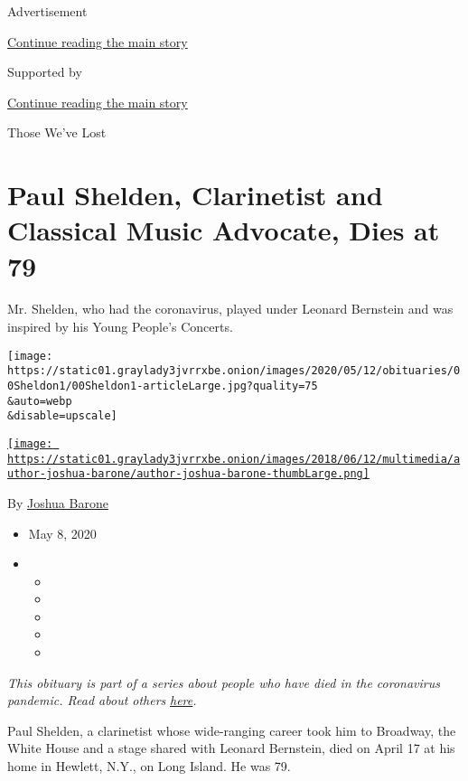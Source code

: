 Advertisement

\protect\hyperlink{after-top}{Continue reading the main story}

Supported by

\protect\hyperlink{after-sponsor}{Continue reading the main story}

Those We've Lost

\hypertarget{paul-shelden-clarinetist-and-classical-music-advocate-dies-at-79}{%
\section{Paul Shelden, Clarinetist and Classical Music Advocate, Dies at
79}\label{paul-shelden-clarinetist-and-classical-music-advocate-dies-at-79}}

Mr. Shelden, who had the coronavirus, played under Leonard Bernstein and
was inspired by his Young People's Concerts.

\texttt{[image: https://static01.graylady3jvrrxbe.onion/images/2020/05/12/obituaries/00Sheldon1/00Sheldon1-articleLarge.jpg?quality=75\\\&auto=webp\\\&disable=upscale]}

\href{https://www.nytimes3xbfgragh.onion/by/joshua-barone}{\texttt{[image: https://static01.graylady3jvrrxbe.onion/images/2018/06/12/multimedia/author-joshua-barone/author-joshua-barone-thumbLarge.png]}}

By \href{https://www.nytimes3xbfgragh.onion/by/joshua-barone}{Joshua
Barone}

\begin{itemize}
\item
  May 8, 2020
\item
  \begin{itemize}
  \item
  \item
  \item
  \item
  \item
  \end{itemize}
\end{itemize}

\emph{This obituary is part of a series about people who have died in
the coronavirus pandemic. Read about others}
\href{https://www.nytimes3xbfgragh.onion/series/people-who-have-died-of-the-coronavirus}{\emph{here}}\emph{.}

Paul Shelden, a clarinetist whose wide-ranging career took him to
Broadway, the White House and a stage shared with Leonard Bernstein,
died on April 17 at his home in Hewlett, N.Y., on Long Island. He was
79.

